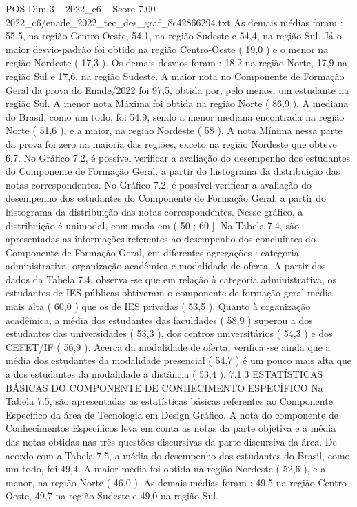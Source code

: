 \begin{textsample}{POS Dim 3 – 2022\_c6 – Score 7.00 – 2022\_c6/enade\_2022\_tec\_des\_graf\_8c42866294.txt}
As demais médias foram : 55,5, na região Centro-Oeste, 54,1, na região Sudeste e 54,4, na região Sul.
Já o maior desvio-padrão foi obtido na região Centro-Oeste ( 19,0 ) e o menor na região Nordeste ( 17,3 ).
Os demais desvios foram : 18,2 na região Norte, 17,9 na região Sul e 17,6, na região Sudeste.
A maior nota no Componente de Formação Geral da prova do Enade/2022 foi 97,5, obtida por, pelo menos, um estudante na região Sul.
A menor nota Máxima foi obtida na região Norte ( 86,9 ).
A mediana do Brasil, como um todo, foi 54,9, sendo a menor mediana encontrada na região Norte ( 51,6 ), e a maior, na região Nordeste ( 58 ).
A nota Mínima nessa parte da prova foi zero na maioria das regiões, exceto na região Nordeste que obteve 6,7.
No Gráfico 7.2, é possível verificar a avaliação do desempenho dos estudantes do Componente de Formação Geral, a partir do histograma da distribuição das notas correspondentes.
No Gráfico 7.2, é possível verificar a avaliação do desempenho dos estudantes do Componente de Formação Geral, a partir do histograma da distribuição das notas correspondentes.
Nesse gráfico, a distribuição é unimodal, com moda em ( 50 ; 60 ].
Na Tabela 7.4, são apresentadas as informações referentes ao desempenho dos concluintes do Componente de Formação Geral, em diferentes agregações : categoria administrativa, organização acadêmica e modalidade de oferta.
A partir dos dados da Tabela 7.4, observa -se que em relação à categoria administrativa, os estudantes de IES públicas obtiveram o componente de formação geral média mais alta ( 60,0 ) que os de IES privadas ( 53,5 ).
Quanto à organização acadêmica, a média dos estudantes das faculdades ( 58,9 ) superou a dos estudantes das universidades ( 53,3 ), dos centros universitários ( 54,3 ) e dos CEFET/IF ( 56,9 ).
Acerca da modalidade de oferta, verifica -se ainda que a média dos estudantes da modalidade presencial ( 54,7 ) é um pouco mais alta que a dos estudantes da modalidade a distância ( 53,4 ). 7.1.3 ESTATÍSTICAS BÁSICAS DO COMPONENTE DE CONHECIMENTO ESPECÍFICO Na Tabela 7.5, são apresentadas as estatísticas básicas referentes ao Componente Específico da área de Tecnologia em Design Gráfico.
A nota do componente de Conhecimentos Específicos leva em conta as notas da parte objetiva e a média das notas obtidas nas três questões discursivas da parte discursiva da área.
De acordo com a Tabela 7.5, a média do desempenho dos estudantes do Brasil, como um todo, foi 49,4.
A maior média foi obtida na região Nordeste ( 52,6 ), e a menor, na região Norte ( 46,0 ).
As demais médias foram : 49,5 na região Centro-Oeste, 49,7 na região Sudeste e 49,0 na região Sul.

\end{textsample}
